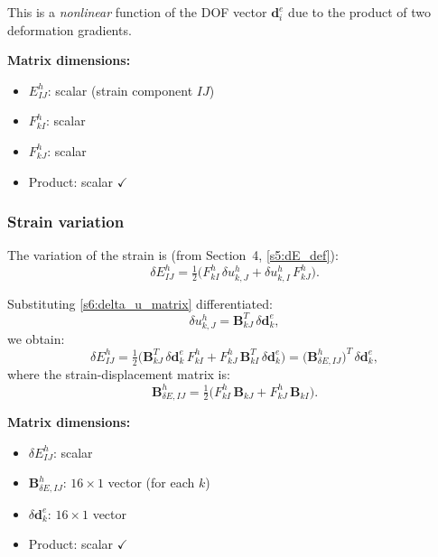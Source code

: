\documentclass[11pt]{article}
\begin{document}
This is a \emph{nonlinear} function of the DOF vector
$\mathbf{d}_{i}^{e}$ due to the product of two deformation gradients.

\textbf{Matrix dimensions:}
\begin{itemize}
\item $E_{IJ}^{h}$: scalar (strain component $IJ$)
\item $F_{kI}^{h}$: scalar
\item $F_{kJ}^{h}$: scalar
\item Product: scalar $\checkmark$
\end{itemize}

\subsubsection{Strain variation}

The variation of the strain is (from Section~4, \eqref{s5:dE_def}):
\begin{equation}
\delta E_{IJ}^{h}
= \tfrac12\bigl(F_{kI}^{h}\,\delta u_{k,J}^{h}
              + \delta u_{k,I}^{h}\,F_{kJ}^{h}\bigr).
\end{equation}

Substituting \eqref{s6:delta_u_matrix} differentiated:
\begin{equation}
\delta u_{k,J}^{h} = \mathbf{B}_{kJ}^{T}\,\delta\mathbf{d}_{k}^{e},
\end{equation}
we obtain:
\begin{equation}
\boxed{
\delta E_{IJ}^{h}
= \tfrac12\bigl(\mathbf{B}_{kJ}^{T}\,\delta\mathbf{d}_{k}^{e}\,F_{kI}^{h}
              + F_{kJ}^{h}\,\mathbf{B}_{kI}^{T}\,\delta\mathbf{d}_{k}^{e}\bigr)
= \bigl(\mathbf{B}_{\delta E,IJ}^{h}\bigr)^{T}\,\delta\mathbf{d}_{k}^{e},
}
\label{s6:deltaE_h}
\end{equation}
where the strain-displacement matrix is:
\begin{equation}
\mathbf{B}_{\delta E,IJ}^{h}
= \tfrac12\bigl(F_{kI}^{h}\,\mathbf{B}_{kJ} + F_{kJ}^{h}\,\mathbf{B}_{kI}\bigr).
\label{s6:B_deltaE}
\end{equation}

\textbf{Matrix dimensions:}
\begin{itemize}
\item $\delta E_{IJ}^{h}$: scalar
\item $\mathbf{B}_{\delta E,IJ}^{h}$: $16\times 1$ vector (for each $k$)
\item $\delta\mathbf{d}_{k}^{e}$: $16\times 1$ vector
\item Product: scalar $\checkmark$
\end{itemize}
\end{document}
